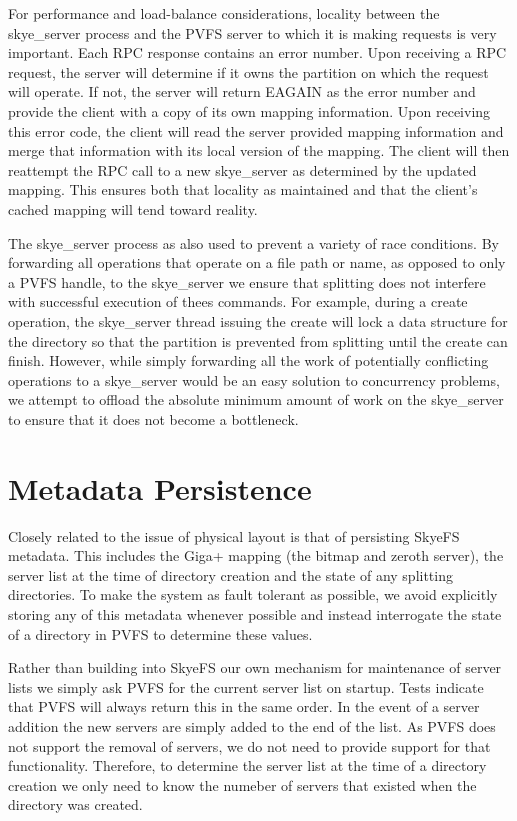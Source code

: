 \documentclass[letterpaper]{article}
\begin{document}
For performance and load-balance considerations, locality between the
skye\_\-server process and the PVFS server to which it is making requests is very
important.  Each RPC response contains an error number.  Upon receiving a RPC
request, the server will determine if it owns the partition on which the request
will operate.  If not, the server will return EAGAIN as the error number and
provide the client with a copy of its own mapping information.
Upon receiving this error code, the client will read the server provided mapping
information and merge that information with its local version of the mapping.
The client will then reattempt the RPC call to a new skye\_\-server as determined
by the updated mapping.  This ensures both that locality as maintained and that
the client's cached mapping will tend toward reality.

The skye\_\-server process as also used to prevent a variety of race conditions.
By forwarding all operations that operate on a file path or name, as opposed to
only a PVFS handle, to the skye\_\-server we ensure that splitting does not
interfere with successful execution of thees commands.  For example, during a
create operation, the skye\_\-server thread issuing the create will lock a data
structure for the directory so that the partition is prevented from splitting
until the create can finish.  However, while simply forwarding all the work of
potentially conflicting operations to a skye\_\-server would be an easy solution to
concurrency problems, we attempt to offload the absolute minimum amount of work
on the skye\_\-server to ensure that it does not become a bottleneck.

\section{Metadata Persistence}
Closely related to the issue of physical layout is that of persisting SkyeFS
metadata.  This includes the Giga+ mapping (the bitmap and zeroth server), the
server list at the time of directory creation and the state of any splitting
directories.  To make the system as fault tolerant as possible, we avoid
explicitly storing any of this metadata whenever possible and instead
interrogate the state of a directory in PVFS to determine these values.

Rather than building into SkyeFS our own mechanism for maintenance of server
lists we simply ask PVFS for the current server list on startup.  Tests indicate
that PVFS will always return this in the same order.  In the event of a server
addition the new servers are simply added to the end of the list.  As PVFS does
not support the removal of servers, we do not need to provide support for that
functionality.  Therefore, to determine the server list at the time of a
directory creation we only need to know the numeber of servers that existed when
the directory was created.
\end{document}
